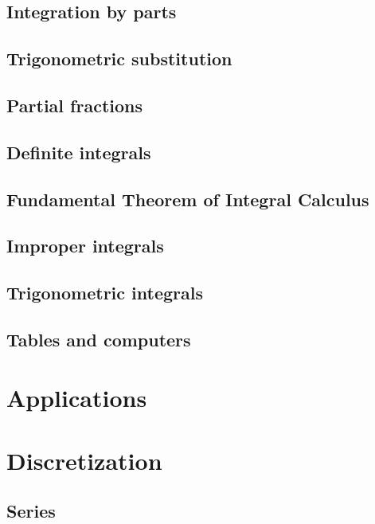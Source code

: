 \documentclass{book}
\begin{document}
\begin{sloppypar}
\section{Integration by parts} \label{ChIntegrationSecIntegrationByParts}
\section{Trigonometric substitution} \label{ChIntegrationSecTrigonometricSubstitution}
\section{Partial fractions} \label{ChIntegrationSecPartialFractions}
\section{Definite integrals} \label{ChIntegrationSecDefiniteIntegrals}
\section{Fundamental Theorem of Integral Calculus} \label{ChIntegrationSecFundamentalTheoremOfIntegralCalculus}
\section{Improper integrals} \label{ChIntegrationSecImproperIntegrals}
\section{Trigonometric integrals} \label{ChIntegrationSecTrigonometricIntegrals}
\section{Tables and computers} \label{ChIntegrationSecTablesAndComputers}

\chapter{Applications} \label{ChApplications}

\chapter{Discretization} \label{ChDiscretization}
\section{Series} \label{ChDiscretizationSecSeries}

\end{sloppypar}
\end{document}
